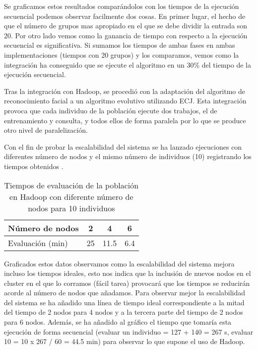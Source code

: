 Se graficamos estos resultados  compar\'andolos con los tiempos de la ejecuci\'on secuencial podemos observar facilmente dos cosas. En primer lugar, el hecho de que el n\'umero de grupos mas apropiado en el que se debe dividir la entrada son 20. Por otro lado vemos como la ganancia de tiempo con respecto a la ejecuci\'on secuencial es significativa. Si sumamos los tiempos de ambas fases en ambas implementaciones (tiempos con 20 grupos) y los comparamos, vemos como la integraci\'on ha conseguido que se ejecute el algoritmo en un 30\% del tiempo de la ejecuci\'on secuencial.


Tras la integraci\'on con Hadoop, se procedi\'o con la adaptaci\'on del algoritmo de reconocimiento facial a un algoritmo evolutivo utilizando ECJ. Esta integraci\'on provoca que cada individuo de la poblaci\'on ejecute dos trabajos, el de entrenamiento y consulta, y todos ellos de forma paralela por lo que se produce otro nivel de paralelizaci\'on. 

Con el fin de probar la escalabilidad del sistema se ha lanzado ejecuciones con diferentes n\'umero de nodos y el mismo n\'umero de individuos (10) registrando los tiempos obtenidos .

\begin{table}[H]
  \begin{center}
    \begin{center}
    \begin{tabular}{l | c c c}
    N\'umero de nodos & 2 & 4 & 6 \\ \hline
    Evaluaci\'on (min) & 25 & 11.5 & 6.4\\
    \end{tabular}
    \end{center}
    \caption{Tiempos de evaluaci\'on de la poblaci\'on en Hadoop con diferente n\'umero de nodos para 10 individuos}
    \label{tabla-dif-num-nodos}
  \end{center}
\end{table}


Graficados estos datos  observamos como la escalabilidad del sistema mejora incluso los tiempos ideales, esto nos indica que la inclusi\'on de nuevos nodos en el cluster en el que lo corramos (f\'acil tarea) provocar\'a que los tiempos se reducir\'an acorde al n\'umero de nodos que a\~nadamos. Para observar mejor la escalabilidad del sistema se ha a\~nadido una l\'inea de tiempo ideal correspondiente a la mitad del tiempo de 2 nodos para 4 nodos y a la tercera parte del tiempo de 2 nodos para 6 nodos. Adem\'as, se ha a\~nadido al gr\'afico el tiempo que tomar\'ia esta ejecuci\'on de forma secuencial (evaluar un individuo {= 127 + 140 = 267 s}, evaluar 10 {= 10 x 267 / 60 = 44.5 min}) para observar lo que supone el uso de Hadoop.

